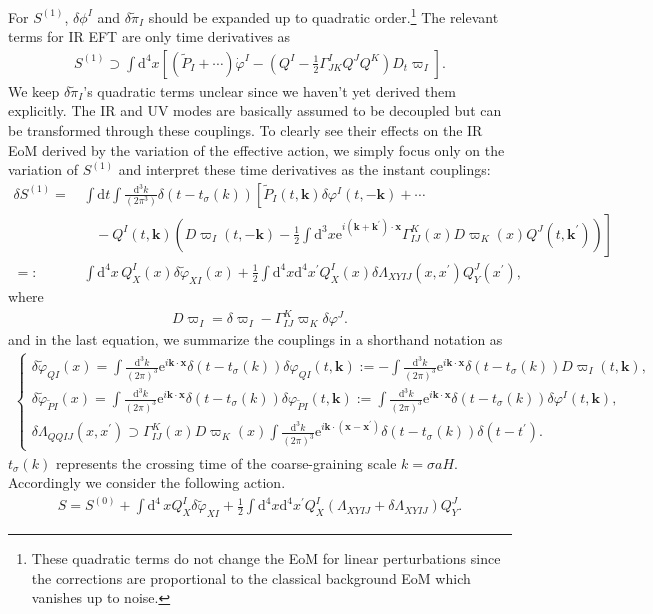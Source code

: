\documentclass[aps, prd
, preprint
, nofootinbib 
, longbibliography
]{revtex4-1}
\newcommand{\dd}{\mathrm{d}}
\newcommand{\ee}{\mathrm{e}}
\newcommand{\dps}{\displaystyle}
\newcommand{\bae}[1]{\begin{align} #1 \end{align}}
\newcommand{\bce}[1]{\begin{cases} #1 \end{cases}}
\begin{document}
For $S^{(1)}$, $\delta\phi^I$ and $\delta\tilde{\pi}_I$ should be expanded up to quadratic order.\footnote{These quadratic terms do not change the EoM for linear perturbations since the corrections are proportional to the classical background EoM which vanishes up to noise.} The relevant terms for IR EFT are only time derivatives as
\bae{
    S^{(1)}\supset\int\dd^4x\left[(\tilde{P}_I+\cdots)\dot{\varphi}^I-\left(Q^I-\frac{1}{2}\Gamma^I_{JK}Q^JQ^K\right)D_t\varpi_I\right].
}
We keep $\delta\tilde{\pi}_I$'s quadratic terms unclear since we haven't yet derived them explicitly.
The IR and UV modes are basically assumed to be decoupled but can be transformed through these couplings.
To clearly see their effects on the IR EoM derived by the variation of the effective action, we simply focus only on the variation of $S^{(1)}$ and interpret these time derivatives as the instant couplings:
\bae{
    \delta S^{(1)}=&\,\int\dd t\int\frac{\dd^3k}{(2\pi^3)}\delta(t-t_\sigma(k))\left[\tilde{P}_I(t,\mathbf{k})\delta\varphi^I(t,-\mathbf{k})+\cdots \right. \nonumber \\
    &\left.\quad-Q^I(t,\mathbf{k})\left(D\varpi_I(t,-\mathbf{k})-\frac{1}{2}\int\dd^3x\ee^{i(\mathbf{k}+\mathbf{k}^\prime)\cdot\mathbf{x}}\Gamma^K_{IJ}(x)D\varpi_K(x)Q^J(t,\mathbf{k}^\prime)\right)\right] \nonumber \\
    =:&\,\int\dd^4x\,Q^I_X(x)\delta\tilde{\varphi}_{XI}(x)+\frac{1}{2}\int\dd^4x\dd^4x^\prime Q_X^I(x)\delta\Lambda_{XYIJ}(x,x^\prime)Q^J_Y(x^\prime),
}
where
\bae{
    D\varpi_I=\delta\varpi_I-\Gamma^K_{IJ}\varpi_K\delta\varphi^J.
}
and in the last equation, we summarize the couplings in a shorthand notation as
\bae{
    \bce{
        \dps
        \delta\tilde{\varphi}_{QI}(x)=\int\frac{\dd^3k}{(2\pi)^3}\ee^{i\mathbf{k}\cdot\mathbf{x}}\delta(t-t_\sigma(k))\delta\varphi_{QI}(t,\mathbf{k})
        :=-\int\frac{\dd^3k}{(2\pi)^3}\ee^{i\mathbf{k}\cdot\mathbf{x}}\delta(t-t_\sigma(k))D\varpi_I(t,\mathbf{k}), \\ 
        \dps
        \delta\tilde{\varphi}_{\tilde{P}I}(x)=\int\frac{\dd^3k}{(2\pi)^3}\ee^{i\mathbf{k}\cdot\mathbf{x}}\delta(t-t_\sigma(k))\delta\varphi_{\tilde{P}I}(t,\mathbf{k})
        :=\int\frac{\dd^3k}{(2\pi)^3}\ee^{i\mathbf{k}\cdot\mathbf{x}}\delta(t-t_\sigma(k))\delta\varphi^I(t,\mathbf{k}), \\
        \dps
        \delta\Lambda_{QQIJ}(x,x^\prime)\supset\Gamma^K_{IJ}(x)D\varpi_K(x)\int\frac{\dd^3k}{(2\pi)^3}\ee^{i\mathbf{k}\cdot(\mathbf{x}-\mathbf{x}^\prime)}\delta(t-t_\sigma(k))\delta(t-t^\prime).
    }
}
$t_\sigma(k)$ represents the crossing time of the coarse-graining scale $k=\sigma aH$.
Accordingly we consider the following action.
\bae{
    S=S^{(0)}+\int\dd^4\,xQ_X^I\delta\tilde{\varphi}_{XI}+\frac{1}{2}\int\dd^4x\dd^4x^\prime Q^I_X(\Lambda_{XYIJ}+\delta\Lambda_{XYIJ})Q^J_Y.
}
\end{document}
